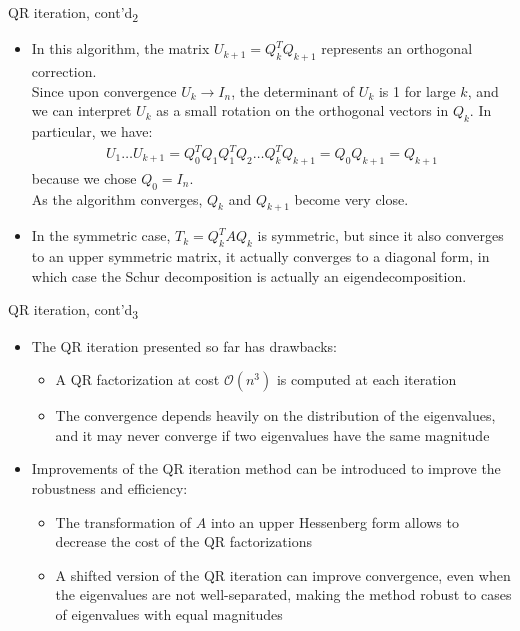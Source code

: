 \documentclass[t,usepdftitle=false]{beamer}
\begin{document}
\begin{frame}{QR iteration, cont'd\textsubscript{2}}
\begin{itemize}
\item In this algorithm, the matrix $U_{k+1}=Q_k^TQ_{k+1}$ represents an orthogonal correction.\vspace{.1cm}\\
Since upon convergence $U_{k}\rightarrow I_n$, the determinant of $U_k$ is 1 for large $k$, and we can interpret $U_k$ as a small rotation on the orthogonal vectors in $Q_k$.
In particular, we have:
\begin{align*}
U_1\dots U_{k+1}=Q_0^TQ_1Q_1^TQ_2\dots Q_k^TQ_{k+1}=Q_0Q_{k+1}=Q_{k+1}
\end{align*}
because we chose $Q_0=I_n$.\vspace{.1cm}\\
As the algorithm converges, $Q_k$ and $Q_{k+1}$ become very close.
\item In the symmetric case, $T_k=Q_k^TAQ_k$ is symmetric, but since it also converges to an upper symmetric matrix, it actually converges to a diagonal form, in which case the Schur decomposition is actually an eigendecomposition.
\end{itemize}
\end{frame}

\begin{frame}{QR iteration, cont'd\textsubscript{3}}
\begin{itemize}
\item The QR iteration presented so far has drawbacks:
\begin{itemize}\normalsize
\item[-] A QR factorization at cost $\mathcal{O}(n^3)$ is computed at each iteration\vspace{.1cm}
\item[-] The convergence depends heavily on the distribution of the eigenvalues, and it may never converge if two eigenvalues have the same magnitude
\end{itemize}
\item Improvements of the QR iteration method can be introduced to improve the robustness and efficiency:
\begin{itemize}\normalsize
\item[-] The transformation of $A$ into an upper Hessenberg form allows to decrease the cost of the QR factorizations\vspace{.1cm}
\item[-] A shifted version of the QR iteration can improve convergence, even when the eigenvalues are not well-separated, making the method robust to cases of eigenvalues with equal magnitudes
\end{itemize}
\end{itemize}
\end{frame}
\end{document}
